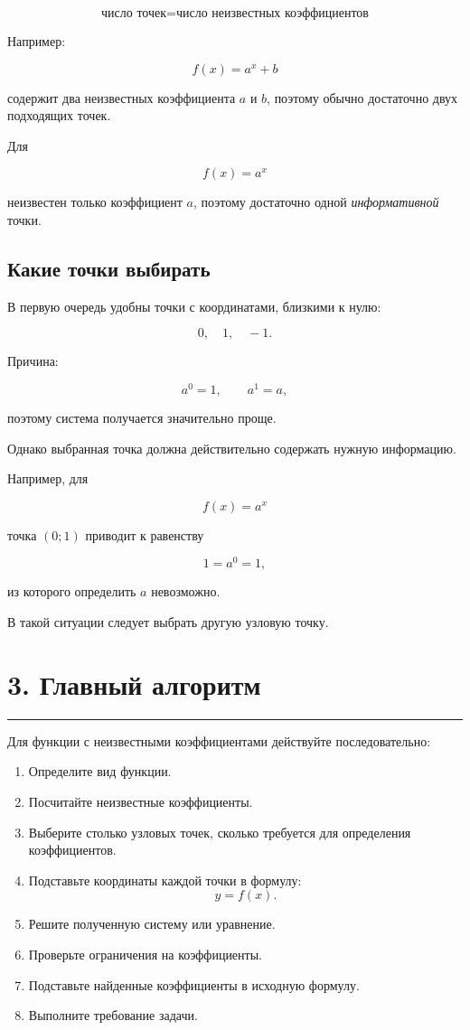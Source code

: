 \documentclass[a4paper,12pt]{article}
\newcommand{\sectionline}{%
    \vspace{0.2em}
    {\color{accent}\rule{\linewidth}{0.7pt}}
    \vspace{0.45em}
}
\begin{document}
\[
\boxed{
\text{число точек}
=
\text{число неизвестных коэффициентов}
}
\]

Например:

\[
f(x)=a^x+b
\]

содержит два неизвестных коэффициента \(a\) и \(b\), поэтому обычно достаточно двух подходящих точек.

Для

\[
f(x)=a^x
\]

неизвестен только коэффициент \(a\), поэтому достаточно одной \emph{информативной} точки.

\subsection*{\textcolor{accent}{Какие точки выбирать}}

В первую очередь удобны точки с координатами, близкими к нулю:

\[
0,\quad 1,\quad -1.
\]

Причина:

\[
a^0=1,\qquad a^1=a,
\]

поэтому система получается значительно проще.

Однако выбранная точка должна действительно содержать нужную информацию.

Например, для

\[
f(x)=a^x
\]

точка \((0;1)\) приводит к равенству

\[
1=a^0=1,
\]

из которого определить \(a\) невозможно.

В такой ситуации следует выбрать другую узловую точку.

\section*{\textcolor{darkaccent}{3. Главный алгоритм}}

\sectionline

Для функции с неизвестными коэффициентами действуйте последовательно:

\begin{enumerate}[leftmargin=9mm,itemsep=2mm]
    \item Определите вид функции.
    \item Посчитайте неизвестные коэффициенты.
    \item Выберите столько узловых точек, сколько требуется для определения коэффициентов.
    \item Подставьте координаты каждой точки в формулу:
    \[
    y=f(x).
    \]
    \item Решите полученную систему или уравнение.
    \item Проверьте ограничения на коэффициенты.
    \item Подставьте найденные коэффициенты в исходную формулу.
    \item Выполните требование задачи.
\end{enumerate}
\end{document}
